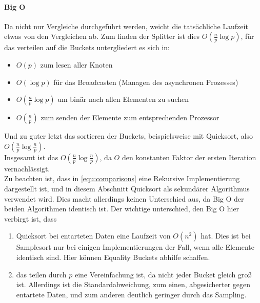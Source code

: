 		\paragraph{Big O}
			Da nicht nur Vergleiche durchgeführt werden, weicht die tatsächliche Laufzeit etwas von den Vergleichen ab.
			Zum finden der Splitter ist dies $O\left(\frac{n}{p}\log{p}\right)$, für das verteilen auf die Buckets untergliedert es sich in: \autocite{wikipedia-contributors-2021}
			\begin{itemize}
				\item $O(p)$ zum lesen aller Knoten
				\item $O(\log{p})$ für das Broadcasten (Managen des asynchronen Prozesses)
				\item $O\left(\frac{n}{p}\log{p}\right)$ um binär nach allen Elementen zu suchen
				\item $O\left(\frac{n}{p}\right)$ zum senden der Elemente zum entsprechenden Prozessor
			\end{itemize}
			Und zu guter letzt das sortieren der Buckets, beispielsweise mit Quicksort, also $O\left(\frac{n}{p}\log{\frac{n}{p}}\right)$.\\
			Insgesamt ist das $O\left(\frac{n}{p}\log{\frac{n}{p}}\right)$, da $O$ den konstanten Faktor der ersten Iteration vernachlässigt.\\
			Zu beachten ist, dass in \ref{equ:comparisons} eine Rekursive Implementierung dargestellt ist, und in diesem Abschnitt Quicksort als sekundärer Algorithmus verwendet wird.
			Dies macht allerdings keinen Unterschied aus, da Big O der beiden Algorithmen identisch ist.
			Der wichtige unterschied, den Big O hier verbirgt ist, dass
			\begin{enumerate}
				\item Quicksort bei entarteten Daten eine Laufzeit von $O\left(n^2\right)$ hat.
					Dies ist bei Samplesort nur bei einigen Implementierungen der Fall, wenn alle Elemente identisch sind.
					Hier können Equality Buckets abhilfe schaffen.
				\item das teilen durch $p$ eine Vereinfachung ist, da nicht jeder Bucket gleich groß ist.
					Allerdings ist die Standardabweichung, zum einen, abgesicherter gegen entartete Daten, und zum anderen deutlich geringer durch das Sampling.
			\end{enumerate}
			

